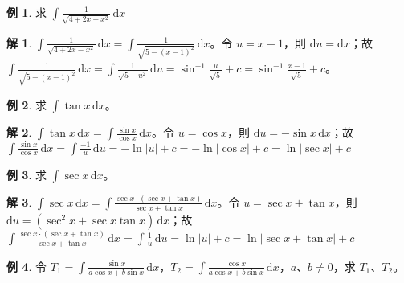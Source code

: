 \documentclass[12pt]{extarticle}
\newcommand{\ds}{\displaystyle}
\theoremstyle{definition}
\newtheorem*{ex}{例}
\newtheorem*{sol}{解}
\begin{document}
\begin{ex}
  求 $\ds\int\!\frac{1}{\sqrt{4 + 2x - x^2}}\,\mathrm{d}x$
\end{ex}
    
\begin{sol}
  $\ds\int\!\frac{1}{\sqrt{4 + 2x - x^2}}\,\mathrm{d}x = \int\!\frac{1}{\sqrt{5 - (x - 1)^2}}\,\mathrm{d}x$。令 $u = x - 1$，則 $\ds\mathrm{d}u = \mathrm{d}x$；故 $\ds\int\!\frac{1}{\sqrt{5 - (x - 1)^2}}\,\mathrm{d}x = \int\!\frac{1}{\sqrt{5 - u^2}}\,\mathrm{d}u = \sin^{-1}\frac{u}{\sqrt{5}} + c = \sin^{-1}\frac{x - 1}{\sqrt{5}} + c$。
\end{sol}

\begin{ex}
  求 $\ds\int\!\tan x\,\mathrm{d}x$。
\end{ex}

\begin{sol}
  $\ds\int\!\tan x\,\mathrm{d}x = \int\!\frac{\sin x}{\cos x}\,\mathrm{d}x$。令 $u = \cos x$，則 $\mathrm{d}u = -\sin x\,\mathrm{d}x$；故 $\ds\int\!\frac{\sin x}{\cos x}\,\mathrm{d}x = \int\!\frac{-1}{u}\,\mathrm{d}u = -\ln|u| + c = -\ln|\cos x| + c = \ln|\sec x| + c$
\end{sol}

\begin{ex}
  求 $\ds\int\!\sec x\,\mathrm{d}x$。
\end{ex}

\begin{sol}
  $\ds\int\!\sec x\,\mathrm{d}x = \int\!\frac{\sec x\cdot(\sec x + \tan x)}{\sec x + \tan x}\,\mathrm{d}x$。令 $u = \sec x + \tan x$，則 $\ds\mathrm{d}u = (\sec^2 x + \sec x\tan x)\,\mathrm{d}x$；故 $\ds\int\!\frac{\sec x\cdot(\sec x + \tan x)}{\sec x + \tan x}\,\mathrm{d}x = \int\!\frac{1}{u}\,\mathrm{d}u = \ln|u| + c = \ln|\sec x + \tan x| + c$
\end{sol}

\begin{ex}
  令 $\ds T_1 = \int\!\frac{\sin x}{a\cos x + b\sin x}\,\text{d}x$，$\ds T_2 = \int\!\frac{\cos x}{a\cos x + b\sin x}\,\text{d}x$，$a$、$b\ne 0$，求 $T_1$、$T_2$。
\end{ex}
\end{document}
